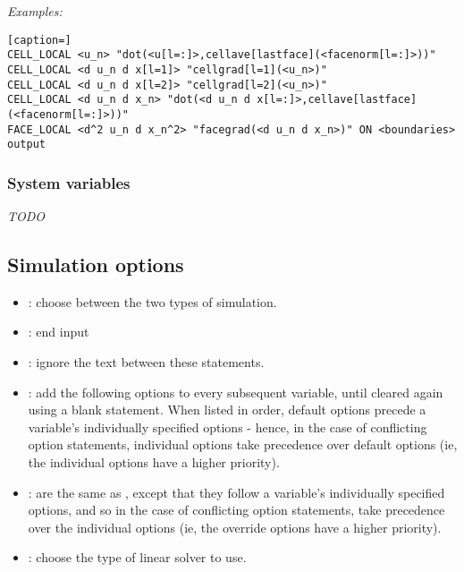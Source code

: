 \emph{Examples:}

\begin{lstlisting}[caption=]
CELL_LOCAL <u_n> "dot(<u[l=:]>,cellave[lastface](<facenorm[l=:]>))"
CELL_LOCAL <d u_n d x[l=1]> "cellgrad[l=1](<u_n>)"
CELL_LOCAL <d u_n d x[l=2]> "cellgrad[l=2](<u_n>)"
CELL_LOCAL <d u_n d x_n> "dot(<d u_n d x[l=:]>,cellave[lastface](<facenorm[l=:]>))"
FACE_LOCAL <d^2 u_n d x_n^2> "facegrad(<d u_n d x_n>)" ON <boundaries> output
\end{lstlisting}

\subsubsection{System variables \label{sec:system_variables}}


\emph{TODO}
\subsection{Simulation options}

\begin{itemize}
\item {}: choose between the two types of simulation.
\item {}: end input
\item {}: ignore the text between these statements.
\item {}: add the following options to every subsequent variable, until cleared again using a blank  statement.  When listed in order, default options precede a variable's individually specified options - hence, in the case of conflicting option statements, individual options take precedence over default options (ie, the individual options have a higher priority).
\item {}: are the same as , except that they follow a variable's individually specified options, and so in the case of conflicting option statements, take precedence over the individual options (ie, the override options have a higher priority).
\item {}: choose the type of linear solver to use.
\end{itemize}

